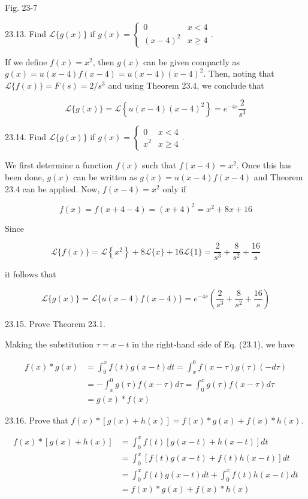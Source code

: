\documentclass[10pt]{article}
\begin{document}
Fig. 23-7

23.13. Find $\mathscr{L}\{g(x)\}$ if $g(x)=\left\{\begin{array}{cc}0 & x<4 \\ (x-4)^{2} & x \geq 4\end{array}\right.$.

If we define $f(x)=x^{2}$, then $g(x)$ can be given compactly as $g(x)=u(x-4) f(x-4)=u(x-4)(x-4)^{2}$. Then, noting that $\mathscr{L}\{f(x)\}=F(s)=2 / s^{3}$ and using Theorem 23.4, we conclude that

$$
\mathscr{L}\{g(x)\}=\mathscr{L}\left\{u(x-4)(x-4)^{2}\right\}=e^{-4 s} \frac{2}{s^{3}}
$$

23.14. Find $\mathscr{L}\{g(x)\}$ if $g(x)=\left\{\begin{array}{cc}0 & x<4 \\ x^{2} & x \geq 4\end{array}\right.$.

We first determine a function $f(x)$ such that $f(x-4)=x^{2}$. Once this has been done, $g(x)$ can be written as $g(x)=u(x-4) f(x-4)$ and Theorem 23.4 can be applied. Now, $f(x-4)=x^{2}$ only if

$$
f(x)=f(x+4-4)=(x+4)^{2}=x^{2}+8 x+16
$$

Since

$$
\mathscr{L}\{f(x)\}=\mathscr{L}\left\{x^{2}\right\}+8 \mathscr{L}\{x\}+16 \mathscr{L}\{1\}=\frac{2}{s^{3}}+\frac{8}{s^{2}}+\frac{16}{s}
$$

it follows that

$$
\mathscr{L}\{g(x)\}=\mathscr{L}\{u(x-4) f(x-4)\}=e^{-4 s}\left(\frac{2}{s^{3}}+\frac{8}{s^{2}}+\frac{16}{s}\right)
$$

23.15. Prove Theorem 23.1.

Making the substitution $\tau=x-t$ in the right-hand side of Eq. (23.1), we have

$$
\begin{aligned}
f(x) * g(x) & =\int_{0}^{x} f(t) g(x-t) d t=\int_{x}^{0} f(x-\tau) g(\tau)(-d \tau) \\
& =-\int_{x}^{0} g(\tau) f(x-\tau) d \tau=\int_{0}^{x} g(\tau) f(x-\tau) d \tau \\
& =g(x) * f(x)
\end{aligned}
$$

23.16. Prove that $f(x) *[g(x)+h(x)]=f(x) * g(x)+f(x) * h(x)$.

$$
\begin{aligned}
f(x) *[g(x)+h(x)] & =\int_{0}^{x} f(t)[g(x-t)+h(x-t)] d t \\
& =\int_{0}^{x}[f(t) g(x-t)+f(t) h(x-t)] d t \\
& =\int_{0}^{x} f(t) g(x-t) d t+\int_{0}^{x} f(t) h(x-t) d t \\
& =f(x) * g(x)+f(x) * h(x)
\end{aligned}
$$
\end{document}
